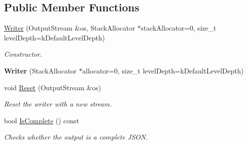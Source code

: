 \subsection*{Public Member Functions}
\begin{DoxyCompactItemize}
\item 
\hyperlink{class_writer_a27998a2e0fcb0aa23c95e1330b340abc}{Writer} (Output\+Stream \&os, Stack\+Allocator $\ast$stack\+Allocator=0, size\+\_\+t level\+Depth=k\+Default\+Level\+Depth)
\begin{DoxyCompactList}\small\item\em Constructor. \end{DoxyCompactList}\item 
{\bfseries Writer} (Stack\+Allocator $\ast$allocator=0, size\+\_\+t level\+Depth=k\+Default\+Level\+Depth)\hypertarget{class_writer_a2a6c946bc2a9dcfdda9f958c3cfee66c}{}\label{class_writer_a2a6c946bc2a9dcfdda9f958c3cfee66c}

\item 
void \hyperlink{class_writer_a4e5bd5e6364edca476125b511b3dca9c}{Reset} (Output\+Stream \&os)
\begin{DoxyCompactList}\small\item\em Reset the writer with a new stream. \end{DoxyCompactList}\item 
bool \hyperlink{class_writer_aced42429d1b31a565c5ca0310bf4e276}{Is\+Complete} () const 
\begin{DoxyCompactList}\small\item\em Checks whether the output is a complete J\+S\+ON. \end{DoxyCompactList}\end{DoxyCompactItemize}
